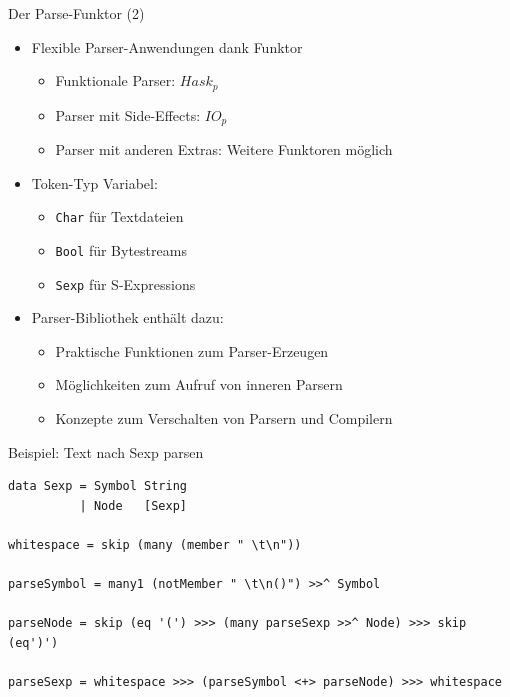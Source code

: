\documentclass{beamer}
\begin{document}
\begin{frame}{Der Parse-Funktor (2)}
  \begin{itemize}
  \item Flexible Parser-Anwendungen dank Funktor
    \begin{itemize}
    \item Funktionale Parser: $Hask_p$
    \item Parser mit Side-Effects: $IO_p$
    \item Parser mit anderen Extras: Weitere Funktoren möglich
    \end{itemize}
  \item Token-Typ Variabel:
    \begin{itemize}
    \item \texttt{Char} für Textdateien
    \item \texttt{Bool} für Bytestreams
    \item \texttt{Sexp} für S-Expressions
    \end{itemize}
  \item Parser-Bibliothek enthält dazu:
    \begin{itemize}
    \item Praktische Funktionen zum Parser-Erzeugen
    \item Möglichkeiten zum Aufruf von inneren Parsern
    \item Konzepte zum Verschalten von Parsern und Compilern
    \end{itemize}
  \end{itemize}
\end{frame}

\begin{frame}[fragile]{Beispiel: Text nach Sexp parsen}
\begin{verbatim}
data Sexp = Symbol String
          | Node   [Sexp]

whitespace = skip (many (member " \t\n"))

parseSymbol = many1 (notMember " \t\n()") >>^ Symbol

parseNode = skip (eq '(') >>> (many parseSexp >>^ Node) >>> skip (eq')')

parseSexp = whitespace >>> (parseSymbol <+> parseNode) >>> whitespace
\end{verbatim}
\end{frame}
\end{document}
